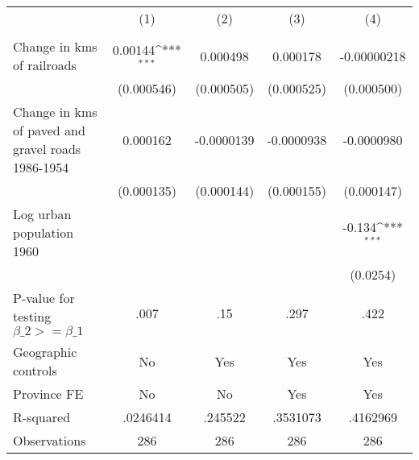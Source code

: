 {
\def\sym#1{\ifmmode^{#1}\else\(^{#1}\)\fi}
\begin{tabular}{l*{4}{c}}
\hline\hline
                &\multicolumn{1}{c}{(1)}&\multicolumn{1}{c}{(2)}&\multicolumn{1}{c}{(3)}&\multicolumn{1}{c}{(4)}\\
                &\multicolumn{1}{c}{}&\multicolumn{1}{c}{}&\multicolumn{1}{c}{}&\multicolumn{1}{c}{}\\
\hline
Change in kms of railroads&  0.00144\sym{***}& 0.000498         & 0.000178         &-0.00000218         \\
                &(0.000546)         &(0.000505)         &(0.000525)         &(0.000500)         \\
[1em]
Change in kms of paved and gravel roads 1986-1954& 0.000162         &-0.0000139         &-0.0000938         &-0.0000980         \\
                &(0.000135)         &(0.000144)         &(0.000155)         &(0.000147)         \\
[1em]
Log urban population 1960&                  &                  &                  &   -0.134\sym{***}\\
                &                  &                  &                  & (0.0254)         \\
\hline
P-value for testing $\beta\_{2} >= \beta\_{1}$&     .007         &      .15         &     .297         &     .422         \\
Geographic controls&       No         &      Yes         &      Yes         &      Yes         \\
Province FE     &       No         &       No         &      Yes         &      Yes         \\
R-squared       & .0246414         &  .245522         & .3531073         & .4162969         \\
Observations    &      286         &      286         &      286         &      286         \\
\hline\hline
\end{tabular}
}

